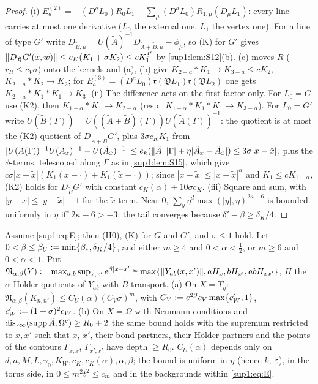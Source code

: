 \begin{proof}
(i) $E^{(2)}_a=-(D^aL_0)R_0L_1-\sum_\mu(D^aL_0)R_{1,\mu}(D_\mu L_1)$: every line carries at most one derivative ($L_0$ the external one, $L_1$ the vertex one). For a line of type $G'$ write $D_{\tilde B,\mu}=U(\tilde A)^{-1}D_{\tilde A+\tilde B,\mu}-\phi_\mu$, so (K) for $G'$ gives $\lVert D_{\tilde B}G'(x,w)\rVert\le c_K(K_1+\sigma K_2)\le cK^{\delta'}_1$ by \cref{sup1:lem:S12}(b). (c) moves $R$ ($r_R\le c_V\sigma$) onto the kernels and (a), (b) give $K_{2-a}*K_1\to K_{3-a}\le cK_2$, $K_{2-a}*K_2\to K_2$; for $E^{(3)}_a=(D^aL_0)\mathfrak r(\mathfrak DL_1)\mathfrak r(\mathfrak DL_2)$ one gets $K_{2-a}*K_1*K_1\to K_3$. (ii) The difference acts on the first factor only. For $L_0=G$ use (K2), then $K_{1-\alpha}*K_1\to K_{2-\alpha}$ (resp.\ $K_{1-\alpha}*K_1*K_1\to K_{3-\alpha}$). For $L_0=G'$ write $U(\tilde B(\Gamma))=U((\tilde A+\tilde B)(\Gamma))U(\tilde A(\Gamma))^{-1}$: the quotient is at most the (K2) quotient of $D_{\tilde A+\tilde B}G'$, plus $3\sigma c_KK_1$ from $|U(\tilde A(\Gamma))^{-1}U(\tilde A_x)^{-1}-U(\tilde A_{\tilde x})^{-1}|\le e_k(\lVert \tilde A\rVert|\Gamma|+\eta|\tilde A_x-\tilde A_{\tilde x}|)\le3\sigma|x-\tilde x|$, plus the $\phi$-terms, telescoped along $\Gamma$ as in \cref{sup1:lem:S15}, which give $c\sigma|x-\tilde x|(K_1(x-\cdot)+K_1(\tilde x-\cdot))$; since $|x-\tilde x|\le|x-\tilde x|^\alpha$ and $K_1\le cK_{1-\alpha}$, (K2) holds for $D_{\tilde B}G'$ with constant $c_K(\alpha)+10\sigma c_K$. (iii) Square and sum, with $|y-x|\le|y-\tilde x|+1$ for the $\tilde x$-term. Near $0$, $\sum_y\eta^d\max(|y|,\eta)^{2\kappa-6}$ is bounded uniformly in $\eta$ iff $2\kappa-6>-3$; the tail converges because $\delta'-\beta\ge\delta_K/4$.
\end{proof}

\begin{proposition}\label{sup1:prop:S14}
Assume \eqref{sup1:eq:E}; then (H0), (K) for $G$ and $G'$, and $\sigma\le1$ hold. Let $0<\beta\le\beta_U:=\min\{\beta_*,\delta_K/4\}$, and either $m\ge4$ and $0<\alpha<\frac12$, or $m\ge6$ and $0<\alpha<1$. Put $\mathfrak N_{\alpha,\beta}(Y):=\max_{a,b}\sup_{x,x'}e^{\beta|x-x'|_\infty}\max\{\lVert Y_{ab}(x,x')\rVert,aH_x,bH_{x'},abH_{xx'}\}$, $H$ the $\alpha$-H\"older quotients of $Y_{ab}$ with $\tilde B$-transport.
\textup{(a)} On $X=T_\eta$: $\mathfrak N_{\alpha,\beta}(K_{n,n'})\le C_U(\alpha)(C_V\sigma)^m$, with $C_V:= e^{2\beta}c_V\max\{c_W',1\}$, $c_W':=(1+\sigma)^2c_W$.
\textup{(b)} On $X=\Omega$ with Neumann conditions and $\operatorname{dist}_\infty(\operatorname{supp}\tilde A,\Omega^c)\ge R_0+2$ the same bound holds with the supremum restricted to $x,x'$ such that $x$, $x'$, their bond partners, their H\"older partners and the points of the contours $\Gamma_{\tilde x,x}$, $\Gamma_{\tilde x',x'}$ have depth $\ge R_0$.
$C_U(\alpha)$ depends only on $d,a,M,L,\gamma_0,K_W,c_K,c_K(\alpha),\alpha,\beta$; the bound is uniform in $\eta$ (hence $k$, $\varepsilon$), in the torus side, in $0\le m^2t^2\le c_m$ and in the backgrounds within \eqref{sup1:eq:E}.
\end{proposition}


